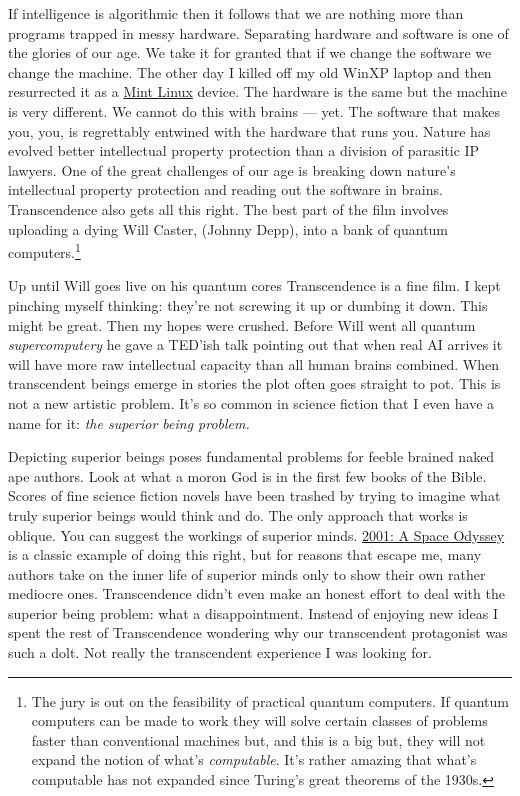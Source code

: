 If intelligence is algorithmic then it follows that we are nothing more
than programs trapped in messy hardware. Separating hardware and
software is one of the glories of our age. We take it for granted that
if we change the software we change the machine. The other day I killed
off my old WinXP laptop and then resurrected it as a
\href{http://www.linuxmint.com/}{Mint Linux} device. The hardware is the
same but the machine is very different. We cannot do this with brains
--- yet. The software that makes you, you, is regrettably entwined with
the hardware that runs you. Nature has evolved better intellectual
property protection than a division of parasitic IP lawyers. One of the
great challenges of our age is breaking down nature's intellectual
property protection and reading out the software in brains.
Transcendence also gets all this right. The best part of the film
involves uploading a dying Will Caster, (Johnny Depp), into a bank of
quantum computers.\footnote{
The jury is out on the feasibility of practical quantum
computers. If quantum computers can be made to work they will solve
certain classes of problems faster than conventional machines but, and
this is a big but, they will not expand the notion of what's
\emph{computable}. It's rather amazing that what's computable has not
expanded since Turing's great theorems of the 1930s.
}

Up until Will goes live on his quantum cores Transcendence is a fine
film. I kept pinching myself thinking: they're not screwing it up or
dumbing it down. This might be great. Then my hopes were crushed.
Before Will went all quantum \emph{supercomputery} he gave a TED'ish
talk pointing out that when real AI arrives it will have more raw
intellectual capacity than all human brains combined. When transcendent
beings emerge in stories the plot often goes straight to pot. This is
not a new artistic problem. It's so common in science fiction that I
even have a name for it: \emph{the superior being problem.}

Depicting superior beings poses fundamental problems for feeble brained
naked ape authors. Look at what a moron God is in the first few books of
the Bible. Scores of fine science fiction novels have been trashed by
trying to imagine what truly superior beings would think and do. The
only approach that works is oblique. You can suggest the workings of
superior minds. \href{http://www.imdb.com/title/tt0062622/}{2001: A
Space Odyssey} is a classic example of doing this right, but for reasons
that escape me, many authors take on the inner life of superior minds
only to show their own rather mediocre ones. Transcendence didn't even
make an honest effort to deal with the superior being
problem: what a disappointment. Instead of enjoying new ideas I spent
the rest of Transcendence wondering why our transcendent protagonist was
such a dolt. Not really the transcendent experience I was looking for.

